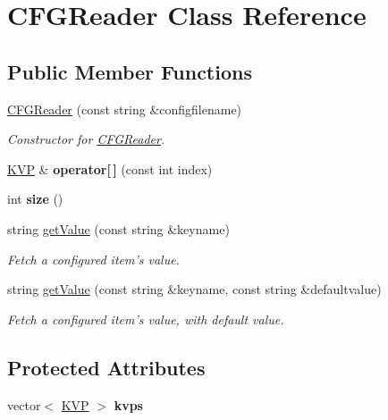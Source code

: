 \hypertarget{classCFGReader}{
\section{CFGReader Class Reference}
\label{classCFGReader}
}
\subsection*{Public Member Functions}
\begin{DoxyCompactItemize}
\item 
\hyperlink{classCFGReader_a391b53ee7d14196b004194b7baed13eb}{CFGReader} (const string \&configfilename)
\begin{DoxyCompactList}\small\item\em Constructor for \hyperlink{classCFGReader}{CFGReader}. \end{DoxyCompactList}\item 
\hypertarget{classCFGReader_a9388e2bdbb574088ede1e11c73d62315}{
\hyperlink{classKVP}{KVP} \& {\bfseries operator\mbox{[}$\,$\mbox{]}} (const int index)}
\label{classCFGReader_a9388e2bdbb574088ede1e11c73d62315}

\item 
\hypertarget{classCFGReader_a34df69c015159cb2859ec2c9f29d41bd}{
int {\bfseries size} ()}
\label{classCFGReader_a34df69c015159cb2859ec2c9f29d41bd}

\item 
string \hyperlink{classCFGReader_a26e27583f19cdcb617adfe3daed18348}{getValue} (const string \&keyname)
\begin{DoxyCompactList}\small\item\em Fetch a configured item's value. \end{DoxyCompactList}\item 
string \hyperlink{classCFGReader_aba28b56de686e116581503a10e626b53}{getValue} (const string \&keyname, const string \&defaultvalue)
\begin{DoxyCompactList}\small\item\em Fetch a configured item's value, with default value. \end{DoxyCompactList}\end{DoxyCompactItemize}
\subsection*{Protected Attributes}
\begin{DoxyCompactItemize}
\item 
\hypertarget{classCFGReader_a017e1dd2fe31bad925a1a2e00bd57503}{
vector$<$ \hyperlink{classKVP}{KVP} $>$ {\bfseries kvps}}
\label{classCFGReader_a017e1dd2fe31bad925a1a2e00bd57503}

\end{DoxyCompactItemize}


